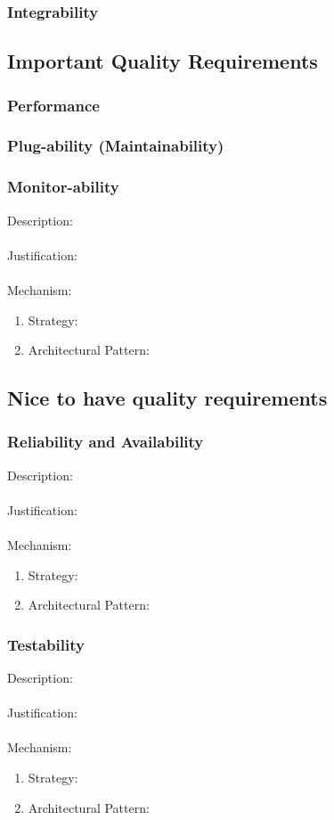 \documentclass[a4paper,12pt,titlepage]{article}
\begin{document}
\subsubsection{Integrability}%
	
\newpage
\subsection{Important Quality Requirements}

\subsubsection{Performance}%
	
	\newpage
\subsubsection{Plug-ability (Maintainability)}%
	
\newpage
\subsubsection{Monitor-ability}%
	Description: \\\\
	Justification: \\\\
	Mechanism:
	\begin{enumerate}
		\item Strategy: 
		\item Architectural Pattern:
	\end{enumerate}
\newpage
\subsection{Nice to have quality requirements}
\subsubsection{Reliability and Availability}%
	Description: \\\\
	Justification: \\\\
	Mechanism:
	\begin{enumerate}
		\item Strategy: 
		\item Architectural Pattern:
	\end{enumerate}
\subsubsection{Testability}%
	Description: \\\\
	Justification: \\\\
	Mechanism:
	\begin{enumerate}
		\item Strategy: 
		\item Architectural Pattern:
	\end{enumerate}
\newpage
\end{document}
